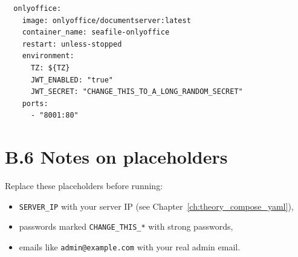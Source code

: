 \begin{lstlisting}
  onlyoffice:
    image: onlyoffice/documentserver:latest
    container_name: seafile-onlyoffice
    restart: unless-stopped
    environment:
      TZ: ${TZ}
      JWT_ENABLED: "true"
      JWT_SECRET: "CHANGE_THIS_TO_A_LONG_RANDOM_SECRET"
    ports:
      - "8001:80"
\end{lstlisting}




\section{B.6 Notes on placeholders}
Replace these placeholders before running:
\begin{itemize}[leftmargin=*]
  \item \texttt{SERVER\_IP} with your server IP (see Chapter~\ref{ch:theory_compose_yaml}),
  \item passwords marked \texttt{CHANGE\_THIS\_*} with strong passwords,
  \item emails like \texttt{admin@example.com} with your real admin email.
\end{itemize}

